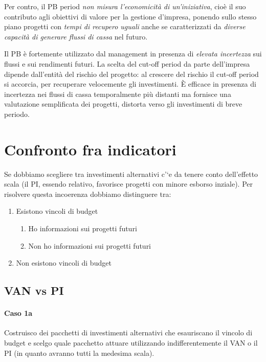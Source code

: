 Per contro, il PB period \emph{non misura l’economicità di un’iniziativa}, cioè il suo contributo agli obiettivi di valore
per la gestione d’impresa, ponendo sullo stesso piano progetti con \emph{tempi di recupero uguali} anche se
caratterizzati da \emph{diverse capacità di generare flussi di cassa} nel futuro.

Il PB \`e fortemente utilizzato dal management in presenza di \emph{elevata incertezza} sui flussi e sui rendimenti futuri.
La scelta del cut-off period da parte dell’impresa dipende dall’entità del rischio del progetto: al crescere
del rischio il cut-off period si accorcia, per recuperare velocemente gli investimenti.
\`E efficace in presenza di incertezza nei flussi di cassa temporalmente più distanti
ma fornisce una valutazione semplificata dei progetti, distorta verso gli investimenti di
breve periodo.

\section{Confronto fra indicatori}

Se dobbiamo scegliere tra investimenti alternativi c'`e da tenere conto dell'effetto scala (il PI, essendo relativo, favorisce progetti
con minore esborso inziale). Per risolvere questa incoerenza dobbiamo distinguere tra:
\begin{enumerate}
	\item Esistono vincoli di budget
	\begin{enumerate}
		\item Ho informazioni sui progetti futuri
		\item Non ho informazioni sui progetti futuri

	\end{enumerate}
	\item Non esistono vincoli di budget
\end{enumerate}

\subsection{VAN vs PI}
\paragraph{Caso 1a}	Costruisco dei pacchetti di investimenti alternativi che esauriscano il vincolo di budget e scelgo
quale pacchetto attuare utilizzando indifferentemente il VAN o il PI (in quanto avranno tutti la medesima
scala).

